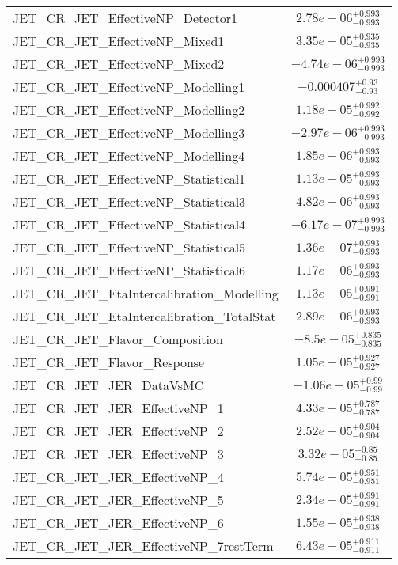 \begin{tabular}{|l|c|}
JET\_CR\_JET\_EffectiveNP\_Detector1 & $2.78e-06^{+0.993}_{-0.993}$ \\
JET\_CR\_JET\_EffectiveNP\_Mixed1 & $3.35e-05^{+0.935}_{-0.935}$ \\
JET\_CR\_JET\_EffectiveNP\_Mixed2 & $-4.74e-06^{+0.993}_{-0.993}$ \\
JET\_CR\_JET\_EffectiveNP\_Modelling1 & $-0.000407^{+0.93}_{-0.93}$ \\
JET\_CR\_JET\_EffectiveNP\_Modelling2 & $1.18e-05^{+0.992}_{-0.992}$ \\
JET\_CR\_JET\_EffectiveNP\_Modelling3 & $-2.97e-06^{+0.993}_{-0.993}$ \\
JET\_CR\_JET\_EffectiveNP\_Modelling4 & $1.85e-06^{+0.993}_{-0.993}$ \\
JET\_CR\_JET\_EffectiveNP\_Statistical1 & $1.13e-05^{+0.993}_{-0.993}$ \\
JET\_CR\_JET\_EffectiveNP\_Statistical3 & $4.82e-06^{+0.993}_{-0.993}$ \\
JET\_CR\_JET\_EffectiveNP\_Statistical4 & $-6.17e-07^{+0.993}_{-0.993}$ \\
JET\_CR\_JET\_EffectiveNP\_Statistical5 & $1.36e-07^{+0.993}_{-0.993}$ \\
JET\_CR\_JET\_EffectiveNP\_Statistical6 & $1.17e-06^{+0.993}_{-0.993}$ \\
JET\_CR\_JET\_EtaIntercalibration\_Modelling & $1.13e-05^{+0.991}_{-0.991}$ \\
JET\_CR\_JET\_EtaIntercalibration\_TotalStat & $2.89e-06^{+0.993}_{-0.993}$ \\
JET\_CR\_JET\_Flavor\_Composition & $-8.5e-05^{+0.835}_{-0.835}$ \\
JET\_CR\_JET\_Flavor\_Response & $1.05e-05^{+0.927}_{-0.927}$ \\
JET\_CR\_JET\_JER\_DataVsMC & $-1.06e-05^{+0.99}_{-0.99}$ \\
JET\_CR\_JET\_JER\_EffectiveNP\_1 & $4.33e-05^{+0.787}_{-0.787}$ \\
JET\_CR\_JET\_JER\_EffectiveNP\_2 & $2.52e-05^{+0.904}_{-0.904}$ \\
JET\_CR\_JET\_JER\_EffectiveNP\_3 & $3.32e-05^{+0.85}_{-0.85}$ \\
JET\_CR\_JET\_JER\_EffectiveNP\_4 & $5.74e-05^{+0.951}_{-0.951}$ \\
JET\_CR\_JET\_JER\_EffectiveNP\_5 & $2.34e-05^{+0.991}_{-0.991}$ \\
JET\_CR\_JET\_JER\_EffectiveNP\_6 & $1.55e-05^{+0.938}_{-0.938}$ \\
JET\_CR\_JET\_JER\_EffectiveNP\_7restTerm & $6.43e-05^{+0.911}_{-0.911}$ \\

\end{tabular}

